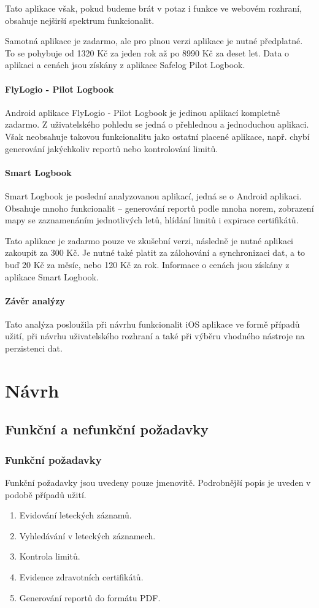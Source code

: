 \documentclass[thesis=M,czech]{FITthesis}[2012/06/26]
\begin{document}
Tato aplikace však, pokud budeme brát v potaz i funkce ve webovém rozhraní, obsahuje nejširší spektrum funkcionalit.

Samotná aplikace je zadarmo, ale pro plnou verzi aplikace je nutné předplatné. To se pohybuje od 1320 Kč za jeden rok až po 8990 Kč za deset let. Data o aplikaci a cenách jsou získány z aplikace Safelog Pilot Logbook.

\subsubsection{FlyLogio - Pilot Logbook}
Android aplikace FlyLogio - Pilot Logbook je jedinou aplikací kompletně zadarmo. Z uživatelského pohledu se jedná o přehlednou a jednoduchou aplikaci.  Však neobsahuje takovou funkcionalitu jako ostatní placené aplikace, např. chybí generování jakýchkoliv reportů nebo kontrolování limitů.

\subsubsection{Smart Logbook}
Smart Logbook je poslední analyzovanou aplikací, jedná se o Android aplikaci. Obsahuje mnoho funkcionalit -- generování reportů podle mnoha norem, zobrazení mapy se zaznamenáním jednotlivých letů, hlídání limitů i expirace certifikátů.

Tato aplikace je zadarmo pouze ve zkušební verzi, následně je nutné aplikaci zakoupit za 300 Kč. Je nutné také platit za zálohování a synchronizaci dat, a to buď 20 Kč za měsíc, nebo 120 Kč za rok. Informace o cenách jsou získány z aplikace Smart Logbook.

\subsubsection{Závěr analýzy}
Tato analýza posloužila při návrhu funkcionalit iOS aplikace ve formě případů užití, při návrhu uživatelského rozhraní a také při výběru vhodného nástroje na perzistenci dat.

\chapter{Návrh}

\section{Funkční a nefunkční požadavky}
\subsection{Funkční požadavky}
Funkční požadavky jsou uvedeny pouze jmenovitě. Podrobnější popis je uveden v podobě případů užití.
\begin{enumerate}
\item Evidování leteckých záznamů.
\item Vyhledávání v leteckých záznamech.
\item Kontrola limitů.
\item Evidence zdravotních certifikátů.
\item Generování reportů do formátu PDF.
\end{enumerate}
\end{document}
